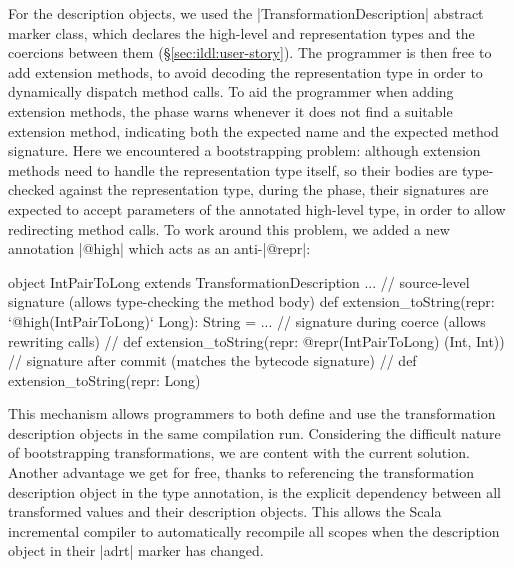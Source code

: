 For the description objects, we used the |TransformationDescription|
abstract marker class, which declares the high-level and
representation types and the coercions between them
(\S\ref{sec:ildl:user-story}). The programmer is then free to add
extension methods, to avoid decoding the representation type
in order to dynamically dispatch method calls. To aid the programmer
when adding extension methods, the \coerce{} phase warns whenever it
does not find a suitable extension method, indicating both the
expected name and the expected method signature. Here we encountered a
bootstrapping problem: although extension methods need to handle the
representation type itself, so their bodies are type-checked against
the representation type, during the \coerce{} phase, their signatures
are expected to accept parameters of the annotated high-level type, in
order to allow redirecting method calls. To work around this problem,
we added a new annotation |@high| which acts as an anti-|@repr|:

\begin{lstlisting-nobreak}
object IntPairToLong extends TransformationDescription {
  ...
  // source-level signature (allows type-checking the method body)
  def extension_toString(repr: `@high(IntPairToLong)` Long): String = ...
  // signature during coerce (allows rewriting calls)
  //   def extension_toString(repr: @repr(IntPairToLong) (Int, Int))
  // signature after commit (matches the bytecode signature)
  //   def extension_toString(repr: Long)
}
\end{lstlisting-nobreak}

This mechanism allows programmers to both define and use the transformation description objects in the same compilation run. Considering the difficult nature of bootstrapping transformations, we are  content with the current solution.
Another advantage we get for free, thanks to referencing the transformation description object in the type annotation, is the explicit dependency between all transformed values and their description objects. This allows the Scala incremental compiler to automatically recompile all scopes when the description object in their |adrt| marker has changed.


